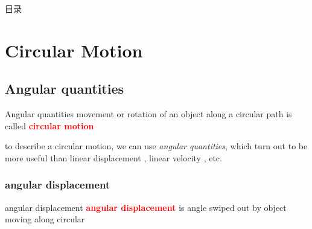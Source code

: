\documentclass[a4paper,11pt]{article}
\makeatletter
\renewcommand{\tableofcontents}{%
	\begin{tikzpicture}[remember picture, overlay]%
	\pgftext[right,x=13.5cm,y=0.2cm]{\color{Gray}\Huge\sc\bfseries \contentsname};%
	\draw[fill=Gray!70,draw=Gray!70] (11.42,-.75) rectangle (20,1);%
	\clip (11.42,-.75) rectangle (20,1);
	\pgftext[right,x=13.5cm,y=0.2cm]{\color{white}\Huge\sc\bfseries \contentsname};%
	\end{tikzpicture}%
	\vspace*{20\p@}%
	\@starttoc{toc}}
\newcommand{\keypoint}[1]{\textbf{\textcolor{red}{#1}}}
\numberwithin{equation}{section}
\numberwithin{figure}{section}
\makeatother
\begin{document}
	
\thispagestyle{empty}


\newpage
\thispagestyle{empty}


\newpage

\begin{ascolorbox14}{\huge 目\quad 录}
\makeatletter
\makeatother
\end{ascolorbox14}
\thispagestyle{empty}

\setcounter{page}{1}
\pagestyle{plain}




\clearpage
\pagestyle{fancy}

\newpage
\setcounter{page}{1}

\section{Circular Motion}


\subsection{Angular quantities}

\begin{ascboxZ}{Angular quantities}
movement or rotation of an object along a circular path is called \keypoint{circular motion}
\end{ascboxZ}

to describe a circular motion, we can use \emph{angular quantities}, which turn out to be more useful than linear displacement , linear velocity , etc.

\subsubsection{angular displacement}

\begin{ascboxA}{angular displacement}
\keypoint{angular displacement} is angle swiped out by object moving along circular
\end{ascboxA}
\end{document}
